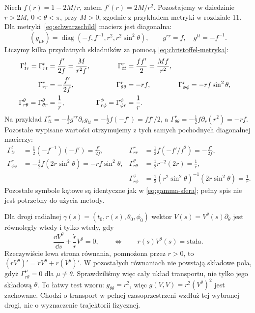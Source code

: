 \begin{przyklad}
\label{prz:koneksja-schwarzschild}
Niech $f(r)=1-2M/r$, zatem $f'(r)=2M/r^2$.
Pozostajemy w dziedzinie $r>2M$, $0<\theta<\pi$,
przy $M>0$, zgodnie z przykładem metryki w rozdziale 11.
Dla metryki~\eqref{eq:schwarzschild}
macierz jest diagonalna:
\[
 (g_{\mu\nu})
 =\operatorname{diag}(-f,f^{-1},r^2,r^2\sin^2\theta),
 \qquad g^{rr}=f,\quad g^{tt}=-f^{-1}.
\]
Liczymy kilka przydatnych składników
za pomocą \eqref{eq:christoffel-metryka}:
\begin{align}\label{eq:gamma-schwarzschild}
 \Gamma^t_{tr}=\Gamma^t_{rt}
   &=\frac{f'}{2f}=\frac{M}{r^2f},
 &\Gamma^r_{tt}&=\frac{ff'}2=\frac{Mf}{r^2},\notag\\
 \Gamma^r_{rr}&=-\frac{f'}{2f},
 &\Gamma^r_{\theta\theta}&=-rf,
 &\Gamma^r_{\phi\phi}&=-rf\sin^2\theta,\\
 \Gamma^\theta_{r\theta}=\Gamma^\theta_{\theta r}
   &=\frac1r,
 &\Gamma^\phi_{r\phi}=\Gamma^\phi_{\phi r}&=\frac1r.
 \notag
\end{align}
Na przykład
$\Gamma^r_{tt}=-\tfrac12g^{rr}\partial_rg_{tt}
=-\tfrac12f(-f')=ff'/2$, a
$\Gamma^r_{\theta\theta}
=-\tfrac12 f\partial_r(r^2)=-rf$.
Pozostałe wypisane wartości otrzymujemy z tych samych
pochodnych diagonalnej macierzy:
\[
 \begin{aligned}
 \Gamma^t_{tr}&=\tfrac12(-f^{-1})(-f')=\frac{f'}{2f},
 &\Gamma^r_{rr}&=\tfrac12f(-f'/f^2)=-\frac{f'}{2f},\\
 \Gamma^r_{\phi\phi}
 &=-\tfrac12f(2r\sin^2\theta)=-rf\sin^2\theta,
 &\Gamma^\theta_{r\theta}
 &=\tfrac12r^{-2}(2r)=\frac1r,\\
 &&\Gamma^\phi_{r\phi}
 &=\tfrac12(r^2\sin^2\theta)^{-1}(2r\sin^2\theta)=\frac1r.
 \end{aligned}
\]
Pozostałe symbole kątowe są identyczne jak
w \eqref{eq:gamma-sfera}; pełny spis nie jest
potrzebny do użycia metody.

Dla drogi radialnej
$\gamma(s)=(t_0,r(s),\theta_0,\phi_0)$
wektor $V(s)=V^\theta(s)\partial_\theta$
jest równoległy wtedy i tylko wtedy, gdy
\[
 \frac{\dd V^\theta}{\dd s}
 +\frac{\dot r}{r}V^\theta=0,
 \qquad\Longleftrightarrow\qquad
 r(s)V^\theta(s)=\text{stała}.
\]
Rzeczywiście lewa strona równania, pomnożona przez $r>0$,
to $(rV^\theta)'=\dot rV^\theta+r(V^\theta)'$.
W pozostałych równaniach nie powstają składowe pola,
gdyż $\Gamma^\mu_{r\theta}=0$ dla $\mu\ne\theta$.
Sprawdziliśmy więc cały układ transportu, nie tylko
jego składową $\theta$.
To łatwy test wzoru: $g_{\theta\theta}=r^2$,
więc $g(V,V)=r^2(V^\theta)^2$ jest zachowane.
Chodzi o transport w pełnej czasoprzestrzeni
wzdłuż tej wybranej drogi, nie o wyznaczenie
trajektorii fizycznej.
\end{przyklad}

